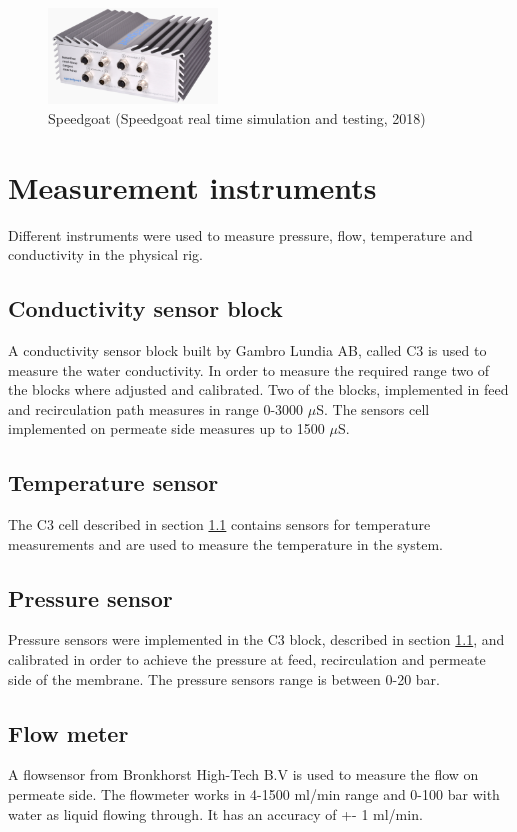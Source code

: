\begin{figure}[h]
    \centering
    \includegraphics[width=0.4\textwidth]{Speedgoat}
    \caption{Speedgoat (Speedgoat real time simulation and testing, 2018)}
    \label{fig:speedgoat}
\end{figure}

\section{Measurement instruments} 
\label{measure}
Different instruments were used to measure pressure, flow, temperature and conductivity in the physical rig.

\subsection{Conductivity sensor block}
\label{senscond}
A conductivity sensor block built by Gambro Lundia AB, called C3 is used to measure the water conductivity. In order to measure the required range two of the blocks where adjusted and calibrated. Two of the blocks, implemented in feed and recirculation path measures in range 0-3000 $\mu$S. The sensors cell implemented on permeate side measures up to 1500 $\mu$S.

\subsection{Temperature sensor}
\label{senstemp}
The C3 cell described in section \ref{senscond} contains sensors for temperature measurements and are used to measure the temperature in the system.

\subsection{Pressure sensor}
\label{senspress}
Pressure sensors were implemented in the C3 block, described in section \ref{senscond}, and calibrated in order to achieve the pressure at feed, recirculation and permeate side of the membrane. The pressure sensors range is between 0-20 bar.


\subsection{Flow meter}
\label{sensflow}
A flowsensor from Bronkhorst High-Tech B.V is used to measure the flow on permeate side. The flowmeter works in 4-1500 ml/min range and 0-100 bar with water as liquid flowing through. It has an accuracy of +- 1 ml/min. 

